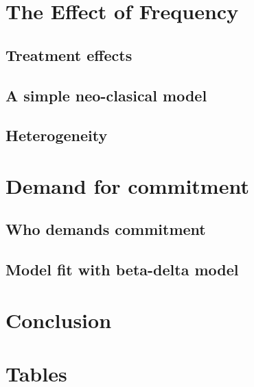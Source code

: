 \documentclass[11pt]{article}
\begin{document}
\section{The Effect of Frequency}
    \subsection{Treatment effects}
    \subsection{A simple neo-clasical model}
    \subsection{Heterogeneity}

\section{Demand for commitment}
    \subsection{Who demands commitment}
    \subsection{Model fit with beta-delta model}
    
\section{}

\section{Conclusion}








\pagebreak


\clearpage

%

%

%




\section{Tables}
\end{document}
